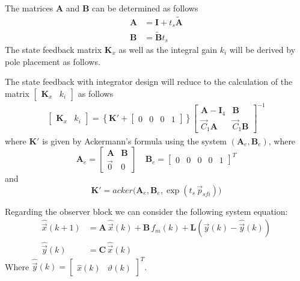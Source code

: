 \documentclass[11pt,a4paper,oneside]{book}
\numberwithin{equation}{section}
\theoremstyle{it}
\theoremstyle{definition}
\begin{document}
The matrices $\mathbf{A}$ and $\mathbf{B}$ can be determined as follows
\begin{equation}
	\begin{aligned}
		\mathbf{A}  &= \mathbf{I}+t_s\tilde{\mathbf{A}} \\[6pt]
		\mathbf{B}  &= \tilde{\mathbf{B}}t_s
	\end{aligned}
\end{equation}
The state feedback matrix $\mathbf{K}_x$ as well as the integral gain $k_i$ will be derived by pole placement as follows.

The state feedback with integrator design will reduce to the calculation of the matrix $\begin{bmatrix}
	\mathbf{K}_x & k_i
\end{bmatrix}$ as follows
\begin{equation}
	\begin{aligned}
		\begin{bmatrix} 
			\mathbf{K}_x & k_i
		\end{bmatrix} = \left\lbrace \mathbf{K'}+
		\begin{bmatrix} 
			0&0&0&1
		\end{bmatrix}\right\rbrace 
		\begin{bmatrix} 
			\mathbf{A}-\mathbf{I}_4 & \mathbf{B}  \\[6pt] 
			\vec{C}_1\mathbf{A} & \vec{C}_1\mathbf{B} 
		\end{bmatrix}^{-1}
	\end{aligned}
\end{equation}
where $\mathbf{K'}$ is given by Ackermann's formula using the system 
$(\mathbf{A}_e,\mathbf{B}_e)$, where
\begin{equation}
	\mathbf{A}_e = \begin{bmatrix} \mathbf{A} & \mathbf{B} \\[6pt] \vec{0} & 
		0\end{bmatrix} \quad 
	\mathbf{B}_e = \begin{bmatrix} 0&0&0&0&1\end{bmatrix}^T
\end{equation}
and 
\begin{equation}
	\mathbf{K'} = 
	acker\Big(\mathbf{A}_e,\mathbf{B}_e,\exp(t_s\,\vec{p}_{sfi})\Big)
\end{equation}

Regarding the observer block we can consider the following system equation:
\begin{equation}
	\begin{aligned}
		\hat{\vec{x}}(k+1)  &= \mathbf{A} \,\hat{\vec{x}}(k) +\mathbf{B} 
		\,f_m(k)+\mathbf{L} \left( \vec{y}(k) - \hat{\vec{y}}(k) \right)  
		\\[6pt]
		\hat{\vec{y}}(k)  &= \mathbf{C} \,\hat{\vec{x}}(k)
	\end{aligned}
\end{equation}
Where $\hat{\vec{y}}(k)=\begin{bmatrix}
	\hat{x}(k) & \hat{\vartheta}(k)
\end{bmatrix}^T$.
\end{document}

